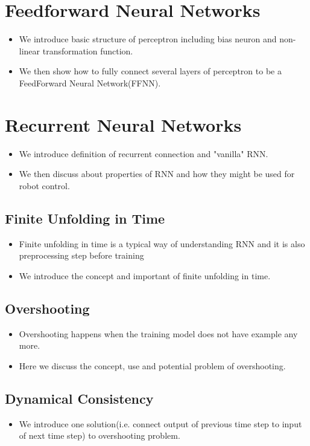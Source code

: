\documentclass[officiallayout]{tktla}
\begin{document}
\section{Feedforward Neural Networks}
\begin{itemize}
\item We introduce basic structure of perceptron including bias neuron and non-linear transformation function.
\item We then show how to fully connect several layers of perceptron to be a FeedForward Neural Network(FFNN).
\end{itemize}
\section{Recurrent Neural Networks}

\begin{itemize}
\item We introduce definition of recurrent connection and "vanilla" RNN.
\item We then discuss about properties of RNN and how they might be used for robot control.
\end{itemize}

\subsection{Finite Unfolding in Time}
\begin{itemize}
\item Finite unfolding in time is a typical way of understanding RNN and it is also preprocessing step before training
\item We introduce the concept and important of finite unfolding in time. 
\end{itemize}

\subsection{Overshooting}
\begin{itemize}
\item Overshooting happens when the training model does not have example any more.
\item Here we discuss the concept, use and potential problem of overshooting.
\end{itemize}

\subsection{Dynamical Consistency}
\begin{itemize}
\item We introduce one solution(i.e. connect output of previous time step to input of next time step) to overshooting problem.
\end{itemize}
\end{document}
